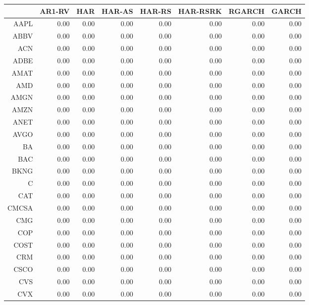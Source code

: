 \begin{table}[ht]
\centering
\begin{tabular}{rrrrrrrr}
  \hline
 & AR1-RV & HAR & HAR-AS & HAR-RS & HAR-RSRK & RGARCH & GARCH \\ 
  \hline
AAPL & 0.00 & 0.00 & 0.00 & 0.00 & 0.00 & 0.00 & 0.00 \\ 
  ABBV & 0.00 & 0.00 & 0.00 & 0.00 & 0.00 & 0.00 & 0.00 \\ 
  ACN & 0.00 & 0.00 & 0.00 & 0.00 & 0.00 & 0.00 & 0.00 \\ 
  ADBE & 0.00 & 0.00 & 0.00 & 0.00 & 0.00 & 0.00 & 0.00 \\ 
  AMAT & 0.00 & 0.00 & 0.00 & 0.00 & 0.00 & 0.00 & 0.00 \\ 
  AMD & 0.00 & 0.00 & 0.00 & 0.00 & 0.00 & 0.00 & 0.00 \\ 
  AMGN & 0.00 & 0.00 & 0.00 & 0.00 & 0.00 & 0.00 & 0.00 \\ 
  AMZN & 0.00 & 0.00 & 0.00 & 0.00 & 0.00 & 0.00 & 0.00 \\ 
  ANET & 0.00 & 0.00 & 0.00 & 0.00 & 0.00 & 0.00 & 0.00 \\ 
  AVGO & 0.00 & 0.00 & 0.00 & 0.00 & 0.00 & 0.00 & 0.00 \\ 
  BA & 0.00 & 0.00 & 0.00 & 0.00 & 0.00 & 0.00 & 0.00 \\ 
  BAC & 0.00 & 0.00 & 0.00 & 0.00 & 0.00 & 0.00 & 0.00 \\ 
  BKNG & 0.00 & 0.00 & 0.00 & 0.00 & 0.00 & 0.00 & 0.00 \\ 
  C & 0.00 & 0.00 & 0.00 & 0.00 & 0.00 & 0.00 & 0.00 \\ 
  CAT & 0.00 & 0.00 & 0.00 & 0.00 & 0.00 & 0.00 & 0.00 \\ 
  CMCSA & 0.00 & 0.00 & 0.00 & 0.00 & 0.00 & 0.00 & 0.00 \\ 
  CMG & 0.00 & 0.00 & 0.00 & 0.00 & 0.00 & 0.00 & 0.00 \\ 
  COP & 0.00 & 0.00 & 0.00 & 0.00 & 0.00 & 0.00 & 0.00 \\ 
  COST & 0.00 & 0.00 & 0.00 & 0.00 & 0.00 & 0.00 & 0.00 \\ 
  CRM & 0.00 & 0.00 & 0.00 & 0.00 & 0.00 & 0.00 & 0.00 \\ 
  CSCO & 0.00 & 0.00 & 0.00 & 0.00 & 0.00 & 0.00 & 0.00 \\ 
  CVS & 0.00 & 0.00 & 0.00 & 0.00 & 0.00 & 0.00 & 0.00 \\ 
  CVX & 0.00 & 0.00 & 0.00 & 0.00 & 0.00 & 0.00 & 0.00 \\ 

\end{tabular}
\end{table}
